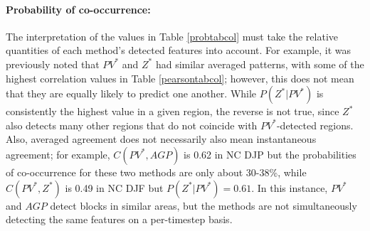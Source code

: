 \documentclass[smallextended]{svjour3}       %
\numberwithin{equation}{section}
\begin{document}
\paragraph{Probability of co-occurrence:} The interpretation of the values in Table \ref{probtabcol} must take the relative quantities of each method's detected features into account. For example, it was previously noted that $PV^*$ and $Z^*$ had similar averaged patterns, with some of the highest correlation values in Table \ref{pearsontabcol}; however, this does not mean that they are equally likely to predict one another. While $P(Z^*|PV^*)$ is consistently the highest value in a given region, the reverse is not true, since $Z^*$ also detects many other regions that do not coincide with $PV^*$-detected regions. Also, averaged agreement does not necessarily also mean instantaneous agreement; for example, $C(PV^*, AGP)$ is 0.62 in NC DJP but the probabilities of co-occurrence for these two methods are only about 30-38\%, while $C(PV^*, Z^*)$ is 0.49 in NC DJF but $P(Z^*|PV^*)=0.61$. In this instance, $PV^*$ and $AGP$ detect blocks in similar areas, but the methods are not simultaneously detecting the same features on a per-timestep basis. 


\end{document}
